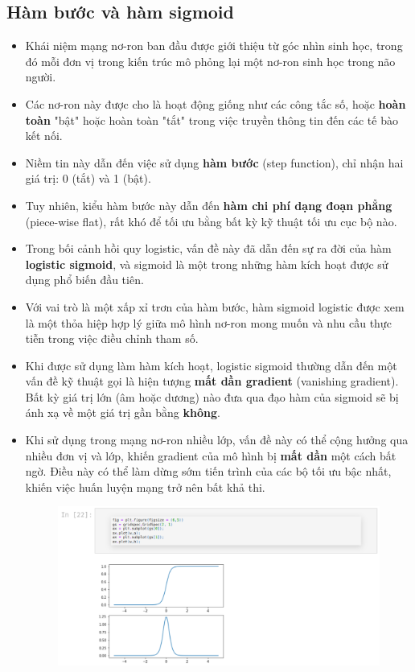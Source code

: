 \documentclass{book}
\begin{document}
    \subsection{Hàm bước và hàm sigmoid}

    \begin{itemize}
        \item Khái niệm mạng nơ-ron ban đầu được giới thiệu từ góc nhìn sinh học, trong đó mỗi đơn vị trong kiến trúc mô phỏng lại một nơ-ron sinh học trong não người.
        \item Các nơ-ron này được cho là hoạt động giống như các công tắc số, hoặc \textbf{hoàn toàn} "bật" hoặc hoàn toàn "tắt" trong việc truyền thông tin đến các tế bào kết nối.
        \item Niềm tin này dẫn đến việc sử dụng \textbf{hàm bước} (step function), chỉ nhận hai giá trị: 0 (tắt) và 1 (bật).
        \item Tuy nhiên, kiểu hàm bước này dẫn đến \textbf{hàm chi phí dạng đoạn phẳng} (piece-wise flat), rất khó để tối ưu bằng bất kỳ kỹ thuật tối ưu cục bộ nào.
        \item Trong bối cảnh hồi quy logistic, vấn đề này đã dẫn đến sự ra đời của hàm \textbf{logistic sigmoid}, và sigmoid là một trong những hàm kích hoạt được sử dụng phổ biến đầu tiên.
        \item Với vai trò là một xấp xỉ trơn của hàm bước, hàm sigmoid logistic được xem là một thỏa hiệp hợp lý giữa mô hình nơ-ron mong muốn và nhu cầu thực tiễn trong việc điều chỉnh tham số.
        \item Khi được sử dụng làm hàm kích hoạt, logistic sigmoid thường dẫn đến một vấn đề kỹ thuật gọi là hiện tượng \textbf{mất dần gradient} (vanishing gradient). Bất kỳ giá trị lớn (âm hoặc dương) nào đưa qua đạo hàm của sigmoid sẽ bị ánh xạ về một giá trị gần bằng \textbf{không}.
        \item Khi sử dụng trong mạng nơ-ron nhiều lớp, vấn đề này có thể cộng hưởng qua nhiều đơn vị và lớp, khiến gradient của mô hình bị \textbf{mất dần} một cách bất ngờ. Điều này có thể làm dừng sớm tiến trình của các bộ tối ưu bậc nhất, khiến việc huấn luyện mạng trở nên bất khả thi.
        \begin{figure}[H]
            \centering
            \includegraphics[width=1.0\linewidth]{images/ac1.png}

\end{figure}
\end{itemize}
\end{document}
